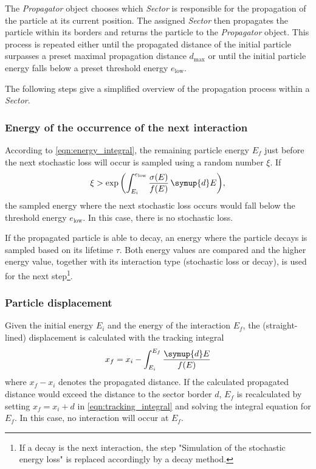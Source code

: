 The \emph{Propagator} object chooses which \emph{Sector} is responsible for the propagation of the particle at its current position.
The assigned \emph{Sector} then propagates the particle within its borders and returns the particle to the \emph{Propagator} object.
This process is repeated either until the propagated distance of the initial particle surpasses a preset maximal propagation distance $d_\text{max}$ or until the initial particle energy falls below a preset threshold energy $e_\text{low}$.

The following steps give a simplified overview of the propagation process within a \emph{Sector}.

\subsubsection{Energy of the occurrence of the next interaction}

According to \eqref{eqn:energy_integral}, the remaining particle energy $E_f$ just before the next stochastic loss will occur is sampled using a random number $\xi$.
If
%
\begin{equation}
	\xi > \exp{\left( \int_{E_i}^{e_\text{low}} \frac{\sigma(E)}{f(E)} \, \symup{d}E \right)},
\end{equation}
%
the sampled energy where the next stochastic loss occurs would fall below the threshold energy $e_\text{low}$.
In this case, there is no stochastic loss.

If the propagated particle is able to decay, an energy where the particle decays is sampled based on its lifetime $\tau$.
Both energy values are compared and the higher energy value, together with its interaction type (stochastic loss or decay), is used for the next step\footnote{If a decay is the next interaction, the step "Simulation of the stochastic energy loss" is replaced accordingly by a decay method.}.

\subsubsection{Particle displacement}

Given the initial energy $E_i$ and the energy of the interaction $E_f$, the (straight-lined) displacement is calculated with the tracking integral
%
\begin{equation}
	\label{eqn:tracking_integral}
	x_f = x_i - \int_{E_i}^{E_f} \frac{\symup{d}E}{f(E)}
\end{equation}
%
where $x_f - x_i$ denotes the propagated distance.
If the calculated propagated distance would exceed the distance to the sector border $d$, $E_f$ is recalculated by setting $x_f = x_i + d$ in \eqref{eqn:tracking_integral} and solving the integral equation for $E_f$.
In this case, no interaction will occur at $E_f$.

